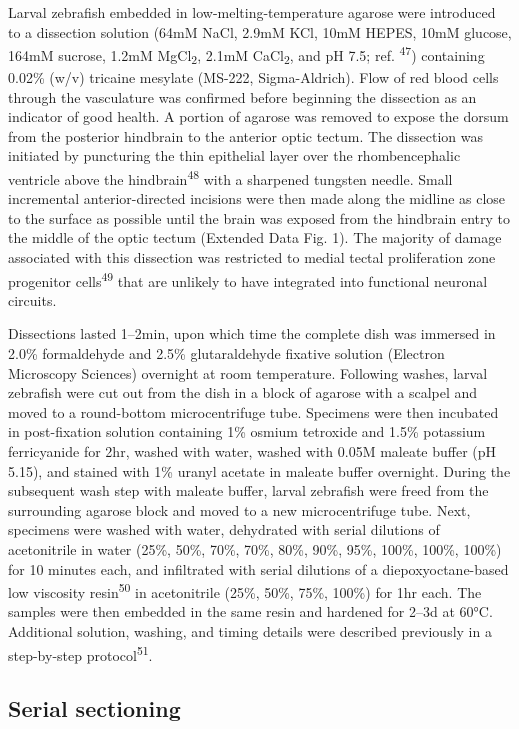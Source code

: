 \documentclass{article}
\begin{document}
Larval zebrafish embedded in low-melting-temperature agarose were introduced to a dissection solution (64mM NaCl, 2.9mM KCl, 10mM HEPES, 10mM glucose, 164mM sucrose, 1.2mM MgCl\textsubscript{2}, 2.1mM CaCl\textsubscript{2}, and pH 7.5; ref. \textsuperscript{47}) containing 0.02\% (w/v) tricaine mesylate (MS-222, Sigma-Aldrich). Flow of red blood cells through the vasculature was confirmed before beginning the dissection as an indicator of good health. A portion of agarose was removed to expose the dorsum from the posterior hindbrain to the anterior optic tectum. The dissection was initiated by puncturing the thin epithelial layer over the rhombencephalic ventricle above the hindbrain\textsuperscript{48} with a sharpened tungsten needle. Small incremental anterior-directed incisions were then made along the midline as close to the surface as possible until the brain was exposed from the hindbrain entry to the middle of the optic tectum (Extended Data Fig. 1). The majority of damage associated with this dissection was restricted to medial tectal proliferation zone progenitor cells\textsuperscript{49} that are unlikely to have integrated into functional neuronal circuits.

Dissections lasted 1–2min, upon which time the complete dish was immersed in 2.0\% formaldehyde and 2.5\% glutaraldehyde fixative solution (Electron Microscopy Sciences)
overnight at room temperature. Following washes, larval zebrafish were cut out from the dish in a block of agarose with a scalpel and moved to a round-bottom microcentrifuge tube. Specimens were then incubated in post-fixation solution containing 1\% osmium tetroxide and 1.5\% potassium ferricyanide for 2hr, washed with water, washed with 0.05M maleate buffer (pH 5.15), and stained with 1\% uranyl acetate in maleate buffer overnight. During the subsequent wash step with maleate buffer, larval zebrafish were freed from the surrounding agarose block and moved to a new microcentrifuge tube. Next, specimens were washed with water, dehydrated with serial dilutions of acetonitrile in water (25\%, 50\%, 70\%, 70\%, 80\%, 90\%, 95\%, 100\%, 100\%, 100\%) for 10 minutes each, and infiltrated with serial dilutions of a diepoxyoctane-based low viscosity resin\textsuperscript{50} in acetonitrile (25\%, 50\%, 75\%, 100\%) for 1hr each. The samples were then embedded in the same resin and hardened for 2–3d at 60°C. Additional solution, washing, and timing details were described previously in a step-by-step protocol\textsuperscript{51}.

\subsection*{Serial sectioning}
\end{document}
